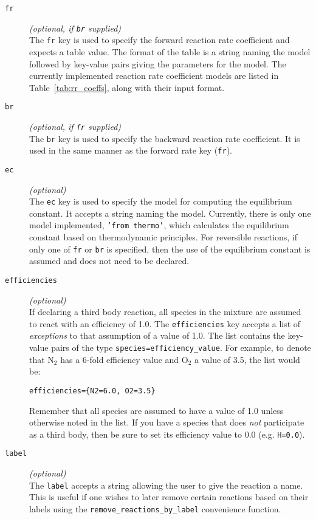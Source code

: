 \begin{description}
\item[\texttt{fr}] \textit{(optional, if \texttt{br} supplied)} \\
    The \texttt{fr} key is used to specify the forward
    reaction rate coefficient and expects a table value.
    The format of the table is a string naming the model followed
    by key-value pairs giving the parameters for the model.
    The currently implemented reaction rate coefficient models
    are listed in Table~\ref{tab:rr_coeffs}, along with their
    input format.
\item[\texttt{br}] \textit{(optional, if \texttt{fr} supplied)} \\
   The \texttt{br} key is used to specify the backward reaction
   rate coefficient.  It is used in the same manner as the forward
   rate key (\texttt{fr}).
\item[\texttt{ec}] \textit{(optional)} \\
   The \texttt{ec} key is used to specify the model for computing
   the equilibrium constant.  It accepts a string naming the model.
   Currently, there is only one model implemented, \texttt{'from thermo'},
   which calculates the equilibrium constant based on thermodynamic principles.
   For reversible reactions, if only one of \texttt{fr} or \texttt{br} is specified,
   then the use of the equilibrium constant is assumed and does not need
   to be declared. 
\item[\texttt{efficiencies}] \textit{(optional)} \\
   If declaring a third body reaction, all species in the mixture are assumed
   to react with an efficiency of 1.0.
   The \texttt{efficiencies} key accepts a list of \emph{exceptions} to
   that assumption of a value of 1.0.
   The list contains the key-value pairs of the type \texttt{species=efficiency\_value}.
   For example, to denote that N$_2$ has a 6-fold efficiency value and O$_2$ a value
   of 3.5, the list would be:
\begin{verbatim}
efficiencies={N2=6.0, O2=3.5}
\end{verbatim}
  Remember that all species are assumed to have a value of 1.0 unless otherwise
  noted in the list.
  If you have a species that does \emph{not} participate as a third body, then
  be sure to set its efficiency value to 0.0 (e.g. \texttt{H=0.0}).
\item[\texttt{label}] \textit{(optional)} \\
  The \texttt{label} accepts a string allowing the user to give the reaction
  a name.
  This is useful if one wishes to later remove certain reactions based on
  their labels using the \texttt{remove\_reactions\_by\_label} convenience
  function.
\end{description}

